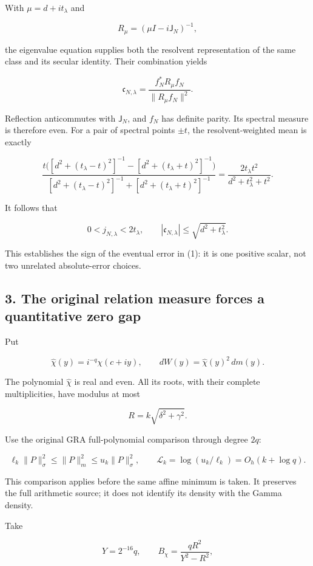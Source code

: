 With \(\mu=d+it_\lambda\) and

\[
R_\mu=(\mu I-i\mathsf J_N)^{-1},
\]

the eigenvalue equation supplies both the resolvent representation of the same class and its secular identity. Their combination yields

\[
\mathfrak c_{N,\lambda}
=
\frac{f_N^*R_\mu f_N}{\|R_\mu f_N\|^2}.
\tag{6}
\]

Reflection anticommutes with \(\mathsf J_N\), and \(f_N\) has definite parity. Its spectral measure is therefore even. For a pair of spectral points \(\pm t\), the resolvent-weighted mean is exactly

\[
\frac{
t\bigl([d^2+(t_\lambda-t)^2]^{-1}
-[d^2+(t_\lambda+t)^2]^{-1}\bigr)
}{
[d^2+(t_\lambda-t)^2]^{-1}
+[d^2+(t_\lambda+t)^2]^{-1}
}
=
\frac{2t_\lambda t^2}{d^2+t_\lambda^2+t^2}.
\]

It follows that

\[
\boxed{
0<j_{N,\lambda}<2t_\lambda,
\qquad
|\mathfrak c_{N,\lambda}|
\le\sqrt{d^2+t_\lambda^2}.
}
\tag{7}
\]

This establishes the sign of the eventual error in (1): it is one positive scalar, not two unrelated absolute-error choices.

\subsection{3. The original relation measure forces a quantitative zero gap}\label{the-original-relation-measure-forces-a-quantitative-zero-gap}

Put

\[
\widehat\chi(y)=i^{-q}\chi(c+iy),
\qquad
dW(y)=\widehat\chi(y)^2\,dm(y).
\]

The polynomial \(\widehat\chi\) is real and even. All its roots, with their complete multiplicities, have modulus at most

\[
R=k\sqrt{\delta^2+\gamma^2}.
\]

Use the original GRA full-polynomial comparison through degree \(2q\):

\[
\ell_k\|P\|_\sigma^2
\le\|P\|_m^2
\le u_k\|P\|_\sigma^2,
\qquad
\mathscr L_k=\log(u_k/\ell_k)
=O_h(k+\log q).
\]

This comparison applies before the same affine minimum is taken. It preserves the full arithmetic source; it does not identify its density with the Gamma density.

Take

\[
Y=2^{-16}q,\qquad
B_\chi=\frac{qR^2}{Y^2-R^2},
\]

